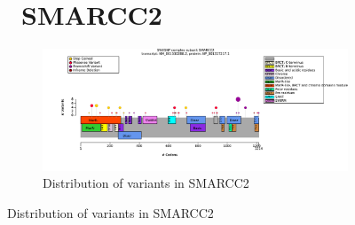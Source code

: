 \begin{figure}[htbp]
\section*{ SMARCC2}
\centering
\begin{subfigure}[b]{0.95\textwidth}
\centering
\includegraphics[width=\textwidth]{ img/SMARCC2_protein_diagram-draft.pdf} 
\captionsetup{justification=raggedright,singlelinecheck=false}
\caption{Distribution of variants in SMARCC2}
\end{subfigure}

\vspace{2em}


\end{figure}
